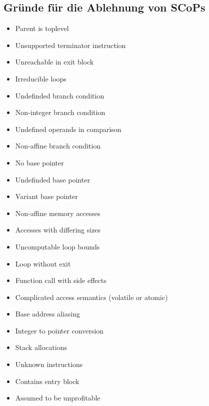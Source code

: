 \subsection{Gründe für die Ablehnung von SCoPs}
\begin{itemize}
    \item Parent is toplevel
        
    \item Unsupported terminator instruction
    \item Unreachable in exit block
        
    \item Irreducible loops
        
    \item Undefinded branch condition
    \item Non-integer branch condition
    \item Undefined operands in comparison
    \item Non-affine branch condition
    \item No base pointer
    \item Undefinded base pointer
    \item Variant base pointer
        
    \item Non-affine memory accesses
        
    \item Accesses with differing sizes
    \item Uncomputable loop bounds
        
    \item Loop without exit
        
    \item Function call with side effects
        
    \item Complicated access semantics (volatile or atomic)
    \item Base address aliasing
        
    \item Integer to pointer conversion
        
    \item Stack allocations
    \item Unknown instructions
    \item Contains entry block
    \item Assumed to be unprofitable
        
\end{itemize}

